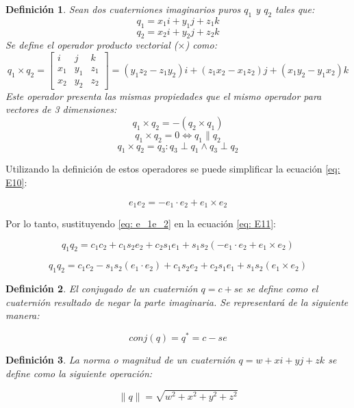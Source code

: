\documentclass[12pt, a4paper]{report}
\newtheorem{defn}{Definición}[section]
\begin{document}
\begin{defn}
Sean dos cuaterniones imaginarios puros $q_1$ y $q_2$ tales que:
$$ q_1 = x_1i + y_1j + z_1k $$
$$ q_2 = x_2i + y_2j + z_2k $$
Se define el operador producto vectorial ($\times$) como:
$$ q_1 \times q_2 = \begin{bmatrix} 
i & j & k \\
x_1 & y_1 & z_1 \\
x_2 & y_2 & z_2
\end{bmatrix} = (y_1z_2 - z_1y_2)i + (z_1x_2 - x_1z_2)j + (x_1y_2 - y_1x_2)k$$
Este operador presenta las mismas propiedades que el mismo operador para vectores de 3 dimensiones:
$$ q_1 \times q_2 = - (q_2 \times q_1) $$
$$ q_1 \times q_2 = 0 \iff q_1 \parallel q_2 $$
$$ q_1 \times q_2 = q_3 : q_3 \perp q_1 \wedge q_3 \perp q_2 $$
\end{defn}

Utilizando la definición de estos operadores se puede simplificar la ecuación \eqref{eq: E10}:

\begin{equation} \label{eq: e_1e_2}
e_1 e_2 =  -e_1 \cdot e_2 + e_1 \times e_2
\end{equation}

Por lo tanto, sustituyendo \eqref{eq: e_1e_2} en la ecuación \eqref{eq: E11}:

$$ q_1 q_2 = c_1 c_2 + c_1 s_2 e_2 + c_2 s_1 e_1 + s_1 s_2 (-e_1 \cdot e_2 + e_1 \times e_2) $$

\begin{equation}
q_1 q_2 = c_1 c_2 - s_1 s_2 (e_1 \cdot e_2) + c_1 s_2 e_2 + c_2 s_1 e_1 + s_1 s_2 (e_1 \times e_2)
\end{equation}

\begin{defn}
El conjugado de un cuaternión $ q = c + s e $ se define como el cuaternión resultado de negar la parte imaginaria. Se representará de la siguiente manera:

\begin{equation} \label{eq: E17}
conj(q) = q^* = c - s e
\end{equation}
\end{defn}

\begin{defn}
La norma o magnitud de un cuaternión $ q = w + xi + yj + zk $ se define como la siguiente operación:

\begin{equation} \label{eq: E16}
\|q\| = \sqrt{w^2 + x^2 + y^2 + z^2}
\end{equation}
\end{defn}
\end{document}
